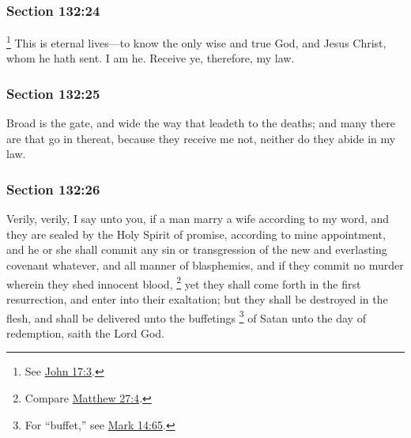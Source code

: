 	\subsubsection{Section 132:24} %
		\label{DC132-24}

			\footnote{%
				See \hyperref[JOHN-17-3]{John 17:3}.	
				}%
		This is eternal lives---to know the only wise and true God, and Jesus Christ, whom he hath sent. I am he. Receive ye, therefore, my law.


	\subsubsection{Section 132:25} %
		\label{DC132-25}

		Broad is the gate, and wide the way that leadeth to the deaths; and many there are that go in thereat, because they receive me not, neither do they abide in my law.


	\subsubsection{Section 132:26} %
		\label{DC132-26}

		Verily, verily, I say unto you, if a man marry a wife according to my word, and they are sealed by the Holy Spirit of promise, according to mine appointment, and he or she shall commit any sin or transgression of the new and everlasting covenant whatever, and all manner of blasphemies, and if they commit no murder wherein they shed innocent blood,%
			\footnote{%
				Compare \hyperref[MATTHEW-27-4]{Matthew 27:4}.
				}
		yet they shall come forth in the first resurrection, and enter into their exaltation; but they shall be destroyed in the flesh, and shall be delivered unto the buffetings%
			\footnote{%
				For ``buffet,'' see \hyperref[MARK-14-65]{Mark 14:65}.
				}
		of Satan unto the day of redemption, saith the Lord God.

